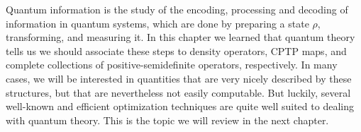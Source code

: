		\ornamentbreak
		Quantum information is the study of the encoding, processing and decoding of information in quantum systems, which are done by preparing a state $\rho$, transforming, and measuring it. In this chapter we learned that quantum theory tells us we should associate these steps to density operators, CPTP maps, and complete collections of positive-semidefinite operators, respectively. In many cases, we will be interested in quantities that are very nicely described by these structures, but that are nevertheless not easily computable. But luckily, several well-known and efficient optimization techniques are quite well suited to dealing with quantum theory. This is the topic we will review in the next chapter.